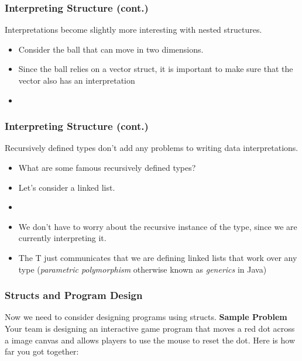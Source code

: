 \documentclass{beamer}
\begin{document}
\begin{frame}
  \frametitle{Interpreting Structure (cont.)}
  Interpretations become slightly more interesting with nested
  structures.
  \begin{itemize}
  \item<2-> Consider the ball that can move in two dimensions.
  \item<3-> Since the ball relies on a vector struct, it is important
    to make sure that the vector also has an interpretation
  \item<4-> \NestedInterp
  \end{itemize}
\end{frame}


\begin{frame}
  \frametitle{Interpreting Structure (cont.)}
  Recursively defined types don't add any problems
  to writing data interpretations.
  \begin{itemize}
  \item<2-> What are some famous recursively defined types?
  \item<3-> Let's consider a linked list.
  \item<4-> \LinkedListInterp
  \item<5-> We don't have to worry about the recursive instance of
    the type, since we are currently interpreting it.
  \item<6-> The T just communicates that we are defining linked lists
    that work over any type (\emph{parametric polymorphism} otherwise
    known as \emph{generics} in Java)
  \end{itemize}
\end{frame}


\begin{frame}
  \frametitle{Structs and Program Design}
  Now we need to consider designing programs using structs.
  \textbf{Sample Problem} Your team is designing an interactive game program that moves a red dot across a image canvas and allows players to use the mouse to reset the dot. Here is how far you got together: \pause
  \moveDotStart
\end{frame}
\end{document}
